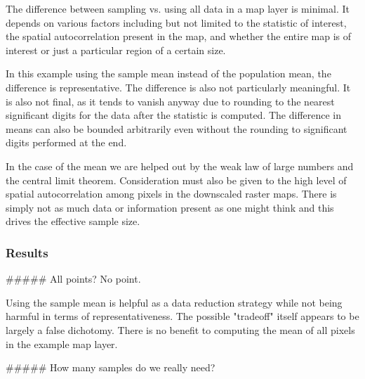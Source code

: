 \documentclass{article}\usepackage[]{graphicx}\usepackage[]{color}
\begin{document}
The difference between sampling vs. using all data in a map layer is minimal.
It depends on various factors including but not limited to the statistic of interest, the spatial autocorrelation present in the map, and whether the entire map is of interest or just a particular region of a certain size.

In this example using the sample mean instead of the population mean, the difference is representative.
The difference is also not particularly meaningful.
It is also not final, as it tends to vanish anyway due to rounding to the nearest significant digits for the data after the statistic is computed.
The difference in means can also be bounded arbitrarily even without the rounding to significant digits performed at the end.

In the case of the mean we are helped out by the weak law of large numbers and the central limit theorem.
Consideration must also be given to the high level of spatial autocorrelation among pixels in the downscaled raster maps.
There is simply not as much data or information present as one might think and this drives the effective sample size.
 
\subsubsection{Results}

##### All points? No point.

Using the sample mean is helpful as a data reduction strategy while not being harmful in terms of representativeness.
The possible "tradeoff" itself appears to be largely a false dichotomy.
There is no benefit to computing the mean of all pixels in the example map layer.

##### How many samples do we really need?
\end{document}
